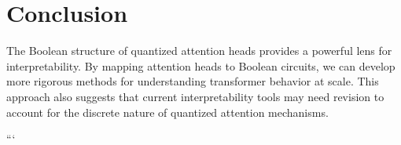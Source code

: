 \section{Conclusion}






The Boolean structure of quantized attention heads provides a powerful lens for interpretability. By mapping attention heads to Boolean circuits, we can develop more rigorous methods for understanding transformer behavior at scale. This approach also suggests that current interpretability tools may need revision to account for the discrete nature of quantized attention mechanisms.





































```





































